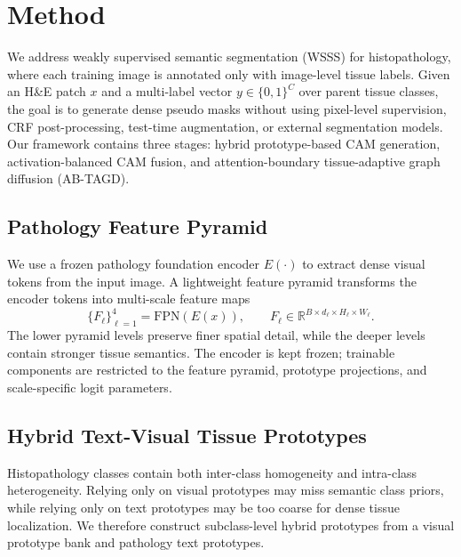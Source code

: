 \section{Method}
\label{sec:method}

We address weakly supervised semantic segmentation (WSSS) for histopathology, where each training image is annotated only with image-level tissue labels. Given an H\&E patch $x$ and a multi-label vector $y \in \{0,1\}^{C}$ over parent tissue classes, the goal is to generate dense pseudo masks without using pixel-level supervision, CRF post-processing, test-time augmentation, or external segmentation models. Our framework contains three stages: hybrid prototype-based CAM generation, activation-balanced CAM fusion, and attention-boundary tissue-adaptive graph diffusion (AB-TAGD).

\subsection{Pathology Feature Pyramid}
\label{subsec:feature_pyramid}

We use a frozen pathology foundation encoder $E(\cdot)$ to extract dense visual tokens from the input image. A lightweight feature pyramid transforms the encoder tokens into multi-scale feature maps
\begin{equation}
    \{F_{\ell}\}_{\ell=1}^{4} = \mathrm{FPN}(E(x)),
    \qquad
    F_{\ell} \in \mathbb{R}^{B \times d_{\ell} \times H_{\ell} \times W_{\ell}} .
\end{equation}
The lower pyramid levels preserve finer spatial detail, while the deeper levels contain stronger tissue semantics. The encoder is kept frozen; trainable components are restricted to the feature pyramid, prototype projections, and scale-specific logit parameters.

\subsection{Hybrid Text-Visual Tissue Prototypes}
\label{subsec:hybrid_prototype}

Histopathology classes contain both inter-class homogeneity and intra-class heterogeneity. Relying only on visual prototypes may miss semantic class priors, while relying only on text prototypes may be too coarse for dense tissue localization. We therefore construct subclass-level hybrid prototypes from a visual prototype bank and pathology text prototypes.

